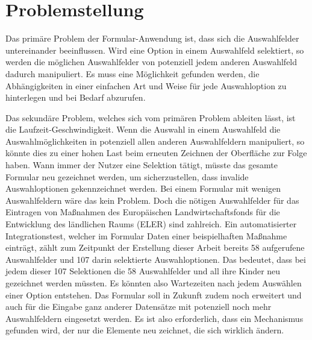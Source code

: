 
\section{Problemstellung}

Das primäre Problem der Formular-Anwendung ist, dass sich die Auswahlfelder untereinander beeinflussen.
Wird eine Option in einem Auswahlfeld selektiert, so werden die möglichen Auswahlfelder von potenziell jedem anderen Auswahlfeld dadurch manipuliert.
Es muss eine Möglichkeit gefunden werden, die Abhängigkeiten in einer einfachen Art und Weise für jede Auswahloption zu hinterlegen und bei Bedarf abzurufen.


Das sekundäre Problem, welches sich vom primären Problem ableiten lässt, ist die  Laufzeit-Geschwindigkeit. 
Wenn die Auswahl in einem Auswahlfeld die Auswahlmöglichkeiten in potenziell allen anderen Auswahlfeldern manipuliert, so könnte dies zu einer hohen Last beim erneuten Zeichnen der Oberfläche zur Folge haben.
Wann immer der Nutzer eine Selektion tätigt, müsste das gesamte Formular neu gezeichnet werden, um sicherzustellen, dass invalide Auswahloptionen gekennzeichnet werden.
Bei einem  Formular mit wenigen Auswahlfeldern wäre das kein Problem.
Doch die nötigen Auswahlfelder für das Eintragen von Maßnahmen  des Europäischen Landwirtschaftsfonds für die Entwicklung des ländlichen Raums (ELER) sind zahlreich.
Ein  automatisierter Integrationstest, welcher im Formular Daten einer beispielhaften Maßnahme einträgt, zählt zum Zeitpunkt der Erstellung dieser Arbeit bereits 58 aufgerufene Auswahlfelder und 107 darin selektierte Auswahloptionen.
Das bedeutet, dass bei jedem dieser 107 Selektionen die 58 Auswahlfelder und all ihre Kinder neu gezeichnet werden müssten.
Es könnten also Wartezeiten nach jedem Auswählen einer Option entstehen.
Das Formular soll in Zukunft zudem noch erweitert und auch für die Eingabe ganz anderer Datensätze mit potenziell noch mehr Auswahlfeldern eingesetzt werden.
Es ist also erforderlich, dass ein Mechanismus gefunden wird,  der nur die Elemente neu zeichnet, die sich wirklich ändern.